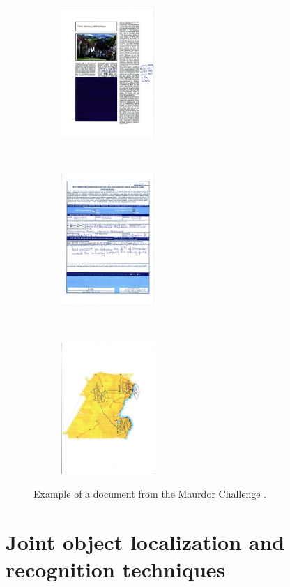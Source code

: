 \documentclass[11pt]{sdm}
\begin{document}
\begin{figure}[t!]
  \centering
  \begin{subfigure}[t]{0.3\textwidth}
    \centering
    \includegraphics[height=5cm]{img/maurdor_1}
  \end{subfigure}%
  ~
  \begin{subfigure}[t]{0.3\textwidth}
    \centering
    \includegraphics[height=5cm]{img/maurdor_2}
  \end{subfigure}%
  ~
  \begin{subfigure}[t]{0.3\textwidth}
    \centering
    \includegraphics[height=5cm]{img/maurdor_3}
  \end{subfigure}
  \caption{\label{maurdor} Example of a document from the Maurdor Challenge \cite{moysset_a2ia_2014}. }
\end{figure}

\section{Joint object localization and recognition techniques} \label{sec:object}
\end{document}
